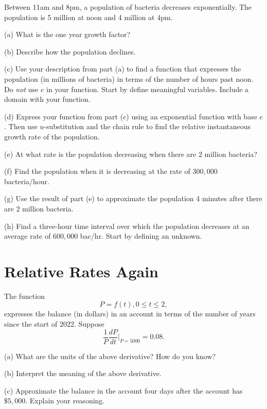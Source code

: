 \documentclass{ximera}
\begin{document}
\begin{question}  \label{Q234gt44}
Between 11am and 8pm, a population of bacteria decreases exponentially. The population is 5 million at noon and 4 million at 4pm.

(a) What is the one year growth factor?

(b) Describe how the population declines.

(c) Use your description from part (a) to find a function that expresses the population (in millions of bacteria) in terms of the number of hours past noon. Do \emph{not} use $e$ in your function. Start by define meaningful variables. Include a domain with your function.

(d) Express your function from part (c) using an exponential function with base $e$. Then use $u$-substitution and the chain rule to find the relative instantaneous growth rate of the population.

(e) At what rate is the population decreasing when there are $2$ million bacteria?

(f) Find the population when it is decreasing at the rate of $300,000$ bacteria/hour.

(g) Use the result of part (e) to approximate the population 4 minutes after there are $2$ million bacteria.

(h) Find a three-hour time interval over which the population decreases at an average rate of $600,000$ bac/hr. Start by defining an unknown.

\end{question}


\section*{Relative Rates Again}

\begin{question}   \label{Q45fggfbhyhy}
The function
\[
     P = f(t) , 0\leq t \leq 2,
\]
expresses the balance (in dollars) in an account in terms of the number of years since the start of 2022. Suppose 
\[
      \frac{1}{P} \frac{dP}{dt} \Big|_{P=5000} = 0.08 .
\]

(a) What are the units of the above derivative? How do you know?

(b) Interpret the meaning of the above derivative.

(c) Approximate the balance in the account four days after the account has $\$5,000$. Explain your reasoning.

\end{question}
\end{document}
